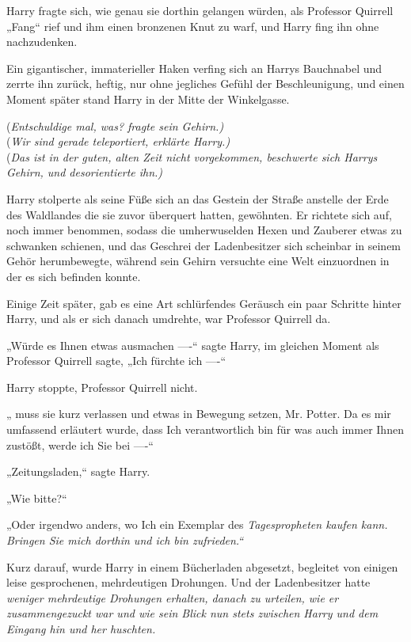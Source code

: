 {Harry fragte sich, wie genau sie dorthin gelangen würden, als Professor Quirrell „Fang“ rief und ihm einen bronzenen Knut zu warf, und Harry fing ihn ohne nachzudenken.

Ein gigantischer, immaterieller Haken verfing sich an Harrys Bauchnabel und zerrte ihn zurück, heftig, nur ohne jegliches Gefühl der Beschleunigung, und einen Moment später stand Harry in der Mitte der Winkelgasse.

(\emph{Entschuldige mal, was? fragte sein Gehirn.)}\\ (\emph{Wir sind gerade teleportiert, erklärte Harry.)}\\ (\emph{Das ist in der guten, alten Zeit nicht vorgekommen, beschwerte sich Harrys Gehirn, und desorientierte ihn.)}

Harry stolperte als seine Füße sich an das Gestein der Straße anstelle der Erde des Waldlandes die sie zuvor überquert hatten, gewöhnten. Er richtete sich auf, noch immer benommen, sodass die umherwuselden Hexen und Zauberer etwas zu schwanken schienen, und das Geschrei der Ladenbesitzer sich scheinbar in seinem Gehör herumbewegte, während sein Gehirn versuchte eine Welt einzuordnen in der es sich befinden konnte.

Einige Zeit später, gab es eine Art schlürfendes Geräusch ein paar Schritte hinter Harry, und als er sich danach umdrehte, war Professor Quirrell da.

„Würde es Ihnen etwas ausmachen ----“ sagte Harry, im gleichen Moment als Professor Quirrell sagte, „Ich fürchte ich ----“

Harry stoppte, Professor Quirrell nicht.

„ muss sie kurz verlassen und etwas in Bewegung setzen, Mr. Potter. Da es mir umfassend erläutert wurde, dass Ich verantwortlich bin für was auch immer Ihnen zustößt, werde ich Sie bei ----“

„Zeitungsladen,“ sagte Harry.

„Wie bitte?“

„Oder irgendwo anders, wo Ich ein Exemplar des \emph{Tagespropheten kaufen kann. Bringen Sie mich dorthin und ich bin zufrieden.“}

Kurz darauf, wurde Harry in einem Bücherladen abgesetzt, begleitet von einigen leise gesprochenen, mehrdeutigen Drohungen. Und der Ladenbesitzer hatte \emph{weniger mehrdeutige Drohungen erhalten, danach zu urteilen, wie er zusammengezuckt war und wie sein Blick nun stets zwischen Harry und dem Eingang hin und her huschten.}

}
